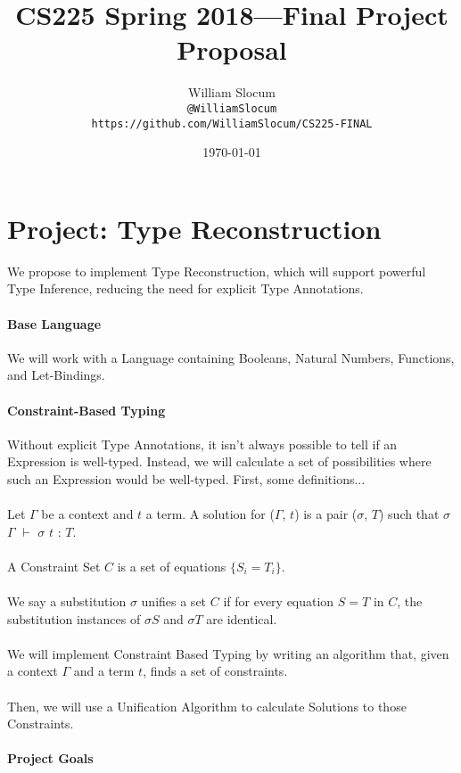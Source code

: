 \documentclass{article}
\title{CS225 Spring 2018---Final Project Proposal}
\author
{
  William Slocum \\ \small{\texttt{@WilliamSlocum}} 
  \\ \small{\texttt{https://github.com/WilliamSlocum/CS225-FINAL}}
}
\date{\today}
\begin{document}
\maketitle

\section*{Project: Type Reconstruction}

We propose to implement Type Reconstruction, which will support powerful Type Inference, reducing the need for explicit Type Annotations.

\paragraph{Base Language}

We will work with a Language containing Booleans, Natural Numbers, Functions, and Let-Bindings.

\paragraph{Constraint-Based Typing} Without explicit Type Annotations, it isn't always possible to tell if an Expression is well-typed. Instead, we will calculate a set of possibilities where such an Expression would be well-typed. First, some definitions...\\
\\
Let $\Gamma$ be a context and $t$ a term. A solution for ($\Gamma$, $t$) is a pair ($\sigma$, $T$) such that $\sigma$ $\Gamma$ $\vdash$ $\sigma$ $t$ : $T$.\\
\\
A Constraint Set $C$ is a set of equations $\{S_{i} = T_{i}\}$. \\
\\
We say a substitution $\sigma$ unifies a set $C$ if for every equation $S = T$ in $C$, the substitution instances of $\sigma S$ and $\sigma T$ are identical. \\
\\
We will implement Constraint Based Typing by writing an algorithm that, given a context $\Gamma$ and a term $t$, finds a set of constraints.\\
\\
Then, we will use a Unification Algorithm to calculate Solutions to those Constraints.

\paragraph{Project Goals}
\end{document}
